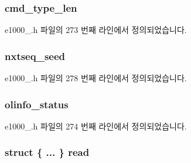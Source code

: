 \subsubsection[{\texorpdfstring{cmd\+\_\+type\+\_\+len}{cmd_type_len}}]{ cmd\+\_\+type\+\_\+len}\hypertarget{unione1000__adv__tx__desc_a4cb6b6e659b19e9e2254f5aca281ad64}{}\label{unione1000__adv__tx__desc_a4cb6b6e659b19e9e2254f5aca281ad64}


e1000\+\_.\+h 파일의 273 번째 라인에서 정의되었습니다.

\subsubsection[{\texorpdfstring{nxtseq\+\_\+seed}{nxtseq_seed}}]{ nxtseq\+\_\+seed}\hypertarget{unione1000__adv__tx__desc_a51070cf827424742e118e1c6e9bcf46d}{}\label{unione1000__adv__tx__desc_a51070cf827424742e118e1c6e9bcf46d}


e1000\+\_.\+h 파일의 278 번째 라인에서 정의되었습니다.

\subsubsection[{\texorpdfstring{olinfo\+\_\+status}{olinfo_status}}]{ olinfo\+\_\+status}\hypertarget{unione1000__adv__tx__desc_a818b8293604ff9a71784eb27809bb907}{}\label{unione1000__adv__tx__desc_a818b8293604ff9a71784eb27809bb907}


e1000\+\_.\+h 파일의 274 번째 라인에서 정의되었습니다.

\subsubsection[{\texorpdfstring{read}{read}}]{\setlength{\rightskip}{0pt plus 5cm}struct \{ ... \}   read}\hypertarget{unione1000__adv__tx__desc_ac2e42c3635da1c7c222910caff36e03a}{}\label{unione1000__adv__tx__desc_ac2e42c3635da1c7c222910caff36e03a}
